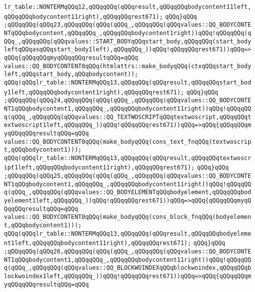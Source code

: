 \verb|lr_table::NONTERMqQQq12,qQQqqQQq(qQQqresult,qQQqqQQqbodycontent11left,qQQqqQQqbodycontent11right),qQQqqQQqrest671);|\newline
\verb|qQQq}qQQq|\newline
\verb|;qQQqqQQq(qQQq23,qQQqqQQq(qQQq(qQQq_,qQQqqQQq(qQQqvalues::QQ_BODYCONTENTqQQqbodycontent,qQQqqQQq_,qQQqqQQqbodycontent1right))qQQq!qQQqqQQq(qQQq_,qQQqqQQq(qQQqvalues::START_BODYqQQqstart_body,qQQqqQQq(start_bodyleftqQQqasqQQqstart_body1left),qQQqqQQq_))qQQq!qQQqqQQqrest671))qQQq=>qQQq{qQQqqQQqmyqQQqqQQqresultqQQq=qQQq|\newline
\verb|values::QQ_BODYCONTENT0qQQq(htmlattrs::make_bodyqQQq(ctxqQQqstart_bodyleft,qQQqstart_body,qQQqbodycontent));|\newline
\verb|qQQq(qQQqlr_table::NONTERMqQQq13,qQQqqQQq(qQQqresult,qQQqqQQqstart_body1left,qQQqqQQqbodycontent1right),qQQqqQQqrest671);|\newline
\verb|qQQq}qQQq|\newline
\verb|;qQQqqQQq(qQQq24,qQQqqQQq(qQQq(qQQq_,qQQqqQQq(qQQqvalues::QQ_BODYCONTENT1qQQqbodycontent1,qQQqqQQq_,qQQqqQQqbodycontent11right))qQQq!qQQqqQQq(qQQq_,qQQqqQQq(qQQqvalues::QQ_TEXTWOSCRIPTqQQqtextwoscript,qQQqqQQqtextwoscript1left,qQQqqQQq_))qQQq!qQQqqQQqrest671))qQQq=>qQQq{qQQqqQQqmyqQQqqQQqresultqQQq=qQQq|\newline
\verb|values::QQ_BODYCONTENT0qQQq(make_bodyqQQq(cons_text_fnqQQq(textwoscript,qQQqbodycontent1)));|\newline
\verb|qQQq(qQQqlr_table::NONTERMqQQq13,qQQqqQQq(qQQqresult,qQQqqQQqtextwoscript1left,qQQqqQQqbodycontent11right),qQQqqQQqrest671);|\newline
\verb|qQQq}qQQq|\newline
\verb|;qQQqqQQq(qQQq25,qQQqqQQq(qQQq(qQQq_,qQQqqQQq(qQQqvalues::QQ_BODYCONTENT1qQQqbodycontent1,qQQqqQQq_,qQQqqQQqbodycontent11right))qQQq!qQQqqQQq(qQQq_,qQQqqQQq(qQQqvalues::QQ_BODYELEMENTqQQqbodyelement,qQQqqQQqbodyelement1left,qQQqqQQq_))qQQq!qQQqqQQqrest671))qQQq=>qQQq{qQQqqQQqmyqQQqqQQqresultqQQq=qQQq|\newline
\verb|values::QQ_BODYCONTENT0qQQq(make_bodyqQQq(cons_block_fnqQQq(bodyelement,qQQqbodycontent1)));|\newline
\verb|qQQq(qQQqlr_table::NONTERMqQQq13,qQQqqQQq(qQQqresult,qQQqqQQqbodyelement1left,qQQqqQQqbodycontent11right),qQQqqQQqrest671);|\newline
\verb|qQQq}qQQq|\newline
\verb|;qQQqqQQq(qQQq26,qQQqqQQq(qQQq(qQQq_,qQQqqQQq(qQQqvalues::QQ_BODYCONTENT1qQQqbodycontent1,qQQqqQQq_,qQQqqQQqbodycontent11right))qQQq!qQQqqQQq(qQQq_,qQQqqQQq(qQQqvalues::QQ_BLOCKWOINDEXqQQqblockwoindex,qQQqqQQqblockwoindex1left,qQQqqQQq_))qQQq!qQQqqQQqrest671))qQQq=>qQQq{qQQqqQQqmyqQQqqQQqresultqQQq=qQQq|\newline
